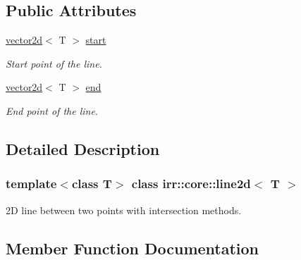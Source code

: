 \subsection*{Public Attributes}
\begin{DoxyCompactItemize}
\item 
\mbox{\label{classirr_1_1core_1_1line2d_ae9a3be281b33b15eb7de868b51651ad8}} 
\hyperlink{classirr_1_1core_1_1vector2d}{vector2d}$<$ T $>$ \hyperlink{classirr_1_1core_1_1line2d_ae9a3be281b33b15eb7de868b51651ad8}{start}
\begin{DoxyCompactList}\small\item\em Start point of the line. \end{DoxyCompactList}\item 
\mbox{\label{classirr_1_1core_1_1line2d_a339c443c3be2c006ac2f616a773f2863}} 
\hyperlink{classirr_1_1core_1_1vector2d}{vector2d}$<$ T $>$ \hyperlink{classirr_1_1core_1_1line2d_a339c443c3be2c006ac2f616a773f2863}{end}
\begin{DoxyCompactList}\small\item\em End point of the line. \end{DoxyCompactList}\end{DoxyCompactItemize}


\subsection{Detailed Description}
\subsubsection*{template$<$class T$>$\newline
class irr\+::core\+::line2d$<$ T $>$}

2D line between two points with intersection methods. 

\subsection{Member Function Documentation}
\mbox{\label{classirr_1_1core_1_1line2d_a0342a0b17c9318cb1eb1183cb91abaf4}} 
